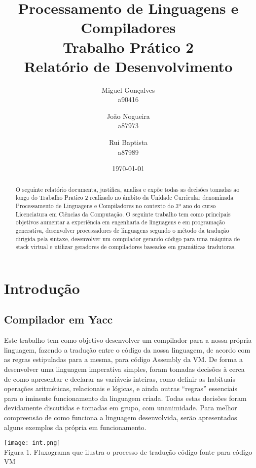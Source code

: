 \documentclass[11pt,a4paper]{report}%
\title{Processamento de Linguagens e Compiladores\\
       \textbf{Trabalho Prático 2}\\ Relatório de Desenvolvimento
       } %
\author{Miguel Gonçalves\\ a90416 \and João Nogueira\\ a87973
         \and Rui Baptista\\ a87989
       } %
\date{\today} %
\def\titulo#1{\section{#1}}    %
\begin{document}
\maketitle %

\begin{abstract}  %
O seguinte relatório documenta, justifica, analisa e expõe todas as decisões tomadas ao longo do Trabalho Pratico 2 realizado no âmbito da Unidade Curricular denominada Processamento de Linguagens e Compiladores no contexto do 3º ano do curso Licenciatura em Ciências da Computação. O seguinte trabalho tem como principais objetivos aumentar a experiência em engenharia de linguagens e em programação generativa, desenvolver processadores de linguagens segundo o método da tradução dirigida pela sintaxe, desenvolver um compilador gerando código para uma máquina de stack virtual e utilizar geradores de compiladores baseados em gramáticas tradutoras. 
\end{abstract}

\tableofcontents %

\chapter{Introdução} \label{chap:intro} %
\titulo{Compilador em Yacc}

Este trabalho tem como objetivo desenvolver um compilador para a nossa própria linguagem, fazendo a tradução entre o código da nossa linguagem, de acordo com as regras estipuladas para a mesma, para código Assembly da VM.
De forma a desenvolver uma linguagem imperativa simples, foram tomadas decisões à cerca de como apresentar e declarar as variáveis inteiras, como definir as habituais operações aritméticas, relacionais e lógicas, e ainda outras “regras” essenciais para o iminente funcionamento da linguagem criada. Todas estas decisões foram devidamente discutidas e tomadas em grupo, com unanimidade.
Para melhor compreensão de como funciona a linguagem desenvolvida, serão apresentados alguns exemplos da própria em funcionamento.


\begin{center}
    \texttt{[image: int.png]}
    \\
    \caption{Figura 1. Fluxograma que ilustra o processo de tradução código fonte para código VM}
\end{center}
\end{document}
